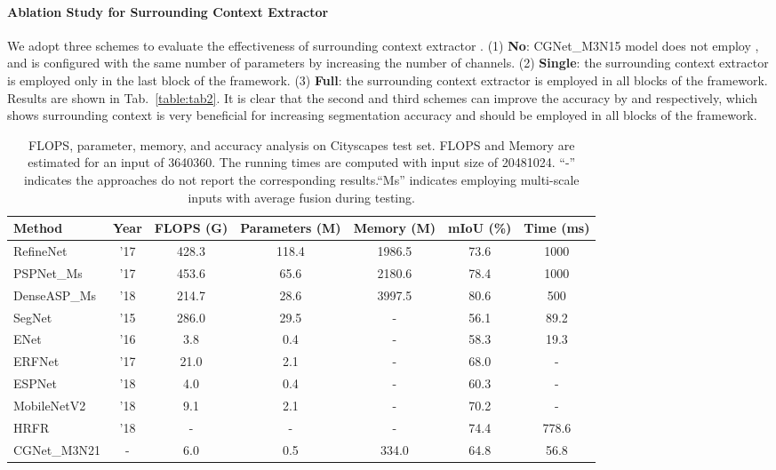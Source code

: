 \documentclass[10pt,twocolumn,letterpaper]{article}
\begin{document}
\paragraph{Ablation Study for Surrounding Context Extractor }
We adopt three schemes to evaluate the effectiveness of surrounding context extractor . (1) \textbf{No}: CGNet\_M3N15 model does not employ , and is configured with the same number of parameters by increasing the number of channels. (2) \textbf{Single}: the surrounding context extractor  is employed only in the last block of the framework. (3) \textbf{Full}: the surrounding context extractor  is employed in all blocks of the framework. Results are shown in Tab.~\ref{table:tab2}. It is clear that the second and third schemes can improve the accuracy by  and  respectively, which shows surrounding context is very beneficial for increasing segmentation accuracy and should be employed in all blocks of the framework.
\begin{table*}[t]
\begin{center}
\begin{tabular}{|lcccccc|}
\hline
Method  &  Year & FLOPS (G)   & Parameters (M)  &  Memory (M)   & mIoU (\%)   &Time (ms)  \\
\hline\hline
RefineNet \cite{lin2017refinenet}     &'17    & 428.3     & 118.4    &1986.5  &73.6   & 1000 \\
PSPNet\_Ms \cite{Zhao_2017_CVPR}          &'17    & 453.6     & 65.6     &2180.6  &78.4   & 1000 \\
DenseASP\_Ms \cite{yang2018denseaspp}    &'18    & 214.7     & 28.6     &3997.5  &80.6   & 500 \\
\hline
SegNet \cite{badrinarayanan2017segnet} &'15    & 286.0     & 29.5    &  -     & 56.1      & 89.2\\
ENet \cite{paszke2016enet}            &'16    & 3.8       &  0.4    &  -     & 58.3      & 19.3 \\
ERFNet \cite{romera2017efficient}     &'17    & 21.0      & 2.1     &  -     & 68.0      & -  \\
ESPNet \cite{mehta2018espnet}         &'18    & 4.0       &  0.4    &  -     & 60.3      & -   \\
MobileNetV2 \cite{sandler2018mobilenetv2} &'18& 9.1       & 2.1    &  -     & 70.2      & -\\
HRFR \cite{zhang2018high}               &  '18 &-          &-       & -  &74.4      &778.6 \\
\hline
CGNet\_M3N21                          &-      & 6.0       & 0.5    & 334.0    &64.8      & 56.8 \\
\hline
\end{tabular}
\end{center}
\caption{FLOPS, parameter, memory, and accuracy analysis on Cityscapes test set. FLOPS and Memory are estimated for an input of 3640360. The running times are computed with input size of 20481024. ``-'' indicates the approaches do not report the corresponding results.``Ms'' indicates employing multi-scale inputs with average fusion during testing.
}
\label{table:tab9}
\vspace{-15pt}
\end{table*}
\end{document}
